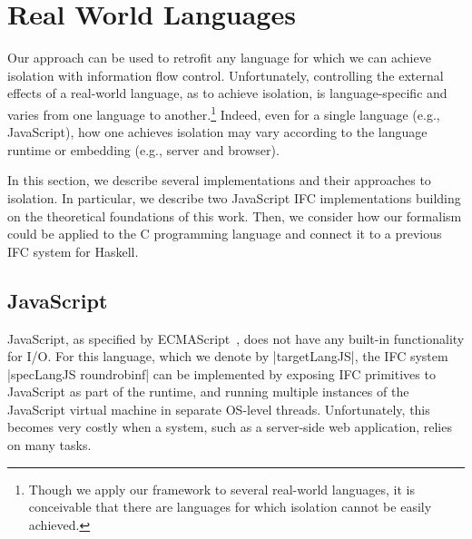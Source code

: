 \section{Real World Languages}
\label{sec:real}

Our approach can be used to retrofit any language for which we
can achieve isolation with information flow control.
%
Unfortunately, controlling the external effects of a real-world
language, as to achieve isolation, is language-specific and varies
from one language to another.\footnote{
  Though we apply our framework to several real-world languages, it is
  conceivable that there are languages for which isolation cannot be
  easily achieved.
}
%
Indeed, even for a single language (e.g., JavaScript), how one
achieves isolation may vary according to the language runtime or
embedding (e.g., server and browser).
%

In this section, we describe several implementations and their
approaches to isolation.
%
In particular, we describe two JavaScript IFC implementations
building on the theoretical foundations of this work.
%
Then, we consider how our formalism could be applied to the C
programming language and connect it to a previous IFC system for
Haskell.
%



%


\subsection{JavaScript}
\label{sec:real:js}

JavaScript, as specified by
ECMAScript~\cite{ecma}, does not have any built-in
functionality for I/O.
%
For this language, which we denote by |targetLangJS|, the IFC system
|specLangJS roundrobinf| can be implemented by exposing IFC primitives
to JavaScript as part of the runtime, and running multiple instances
of the JavaScript virtual machine in separate OS-level threads.
%
Unfortunately, this becomes very costly when a system, such as a
server-side web application, relies on many tasks.
%

